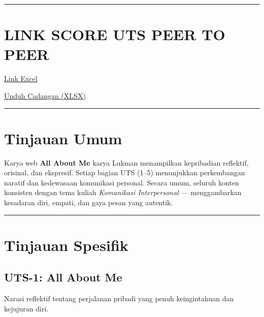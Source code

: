 \documentclass[
  letterpaper,
  DIV=11,
  numbers=noendperiod]{scrreprt}
\begin{document}
\begin{center}\rule{0.5\linewidth}{0.5pt}\end{center}

\section{LINK SCORE UTS PEER TO PEER}\label{link-score-uts-peer-to-peer}

\href{https://docs.google.com/spreadsheets/d/1e1VKO3qTs9bRmDoLfmCZYr2Acg0--6_l/edit?usp=sharing&ouid=113644725819428153387&rtpof=true&sd=true}{Link
Excel}

\href{My_Personal_Reviews/UTS-5_Skor-2.xlsx}{Unduh Cadangan (XLSX)}

\begin{center}\rule{0.5\linewidth}{0.5pt}\end{center}

\section{Tinjauan Umum}\label{tinjauan-umum}

Karya web \textbf{All About Me} karya Lukman menampilkan kepribadian
reflektif, orisinal, dan ekspresif. Setiap bagian UTS (1--5) menunjukkan
perkembangan naratif dan kedewasaan komunikasi personal. Secara umum,
seluruh konten konsisten dengan tema kuliah \emph{Komunikasi
Interpersonal} --- menggambarkan kesadaran diri, empati, dan gaya pesan
yang autentik.

\begin{center}\rule{0.5\linewidth}{0.5pt}\end{center}

\section{Tinjauan Spesifik}\label{tinjauan-spesifik}

\subsection{UTS-1: All About Me}\label{uts-1-all-about-me}

Narasi reflektif tentang perjalanan pribadi yang penuh keingintahuan dan
kejujuran diri.
\end{document}
